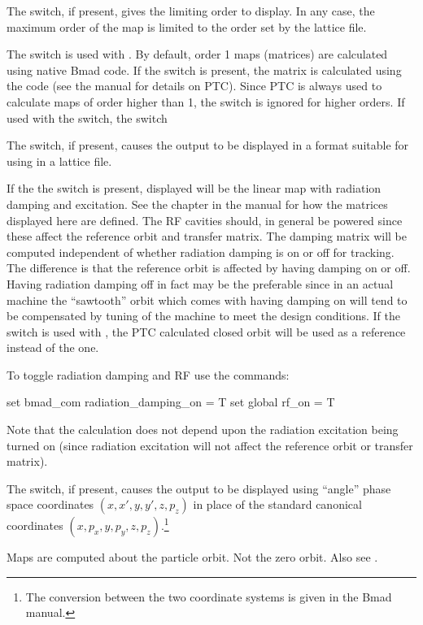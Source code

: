 {{{{{{{{{{The  switch, if present, gives the limiting order to display. In any case, the
maximum order of the map is limited to the order set by the lattice file.

The  switch is used with . By default, order 1 maps (matrices) are calculated
using native Bmad code. If the  switch is present, the matrix is calculated using the
 code (see the \bmad manual for details on PTC). Since PTC is always used to calculate maps
of order higher than 1, the  switch is ignored for higher orders. If used with the
 switch, the  switch 

The  switch, if present, causes the output to be displayed in a format suitable
for using in a \bmad lattice file.

If the the  switch is present, displayed will be the linear map with radiation
damping and excitation. See the  chapter in the \bmad manual for how the
matrices displayed here are defined. The RF cavities should, in general be powered since these
affect the reference orbit and transfer matrix. The damping matrix will be computed independent of
whether radiation damping is on or off for tracking. The difference is that the reference orbit is
affected by having damping on or off. Having radiation damping off in fact may be the preferable
since in an actual machine the ``sawtooth'' orbit which comes with having damping on will tend to be
compensated by tuning of the machine to meet the design conditions. If the  switch is used
with , the PTC calculated closed orbit will be used as a reference instead of the
\bmad one.

To toggle radiation damping and RF use the commands:
\begin{example}
  set bmad_com radiation_damping_on = T
  set global rf_on = T
\end{example}
Note that the calculation does not depend upon the radiation excitation being turned on (since
radiation excitation will not affect the reference orbit or transfer matrix).

The  switch, if present, causes the output to be displayed using ``angle''
phase space coordinates $(x, x', y, y', z, p_z)$ in place of the standard \bmad canonical
coordinates $(x, p_x, y, p_y, z, p_z)$.\footnote
  {
The conversion between the two coordinate systems is given in the Bmad manual.
  }

Maps are computed about the particle orbit. Not the zero orbit. Also see .

}}}}}}}}}}
